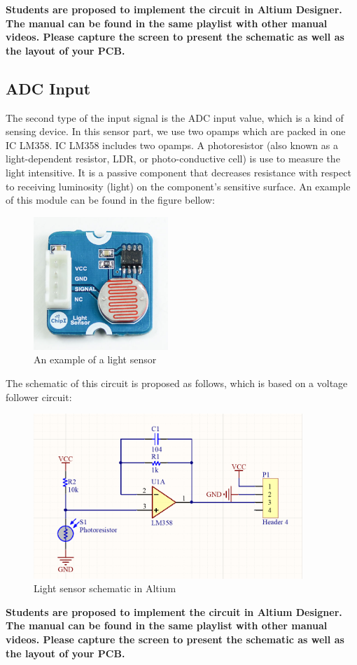 \textbf{Students are proposed to implement the circuit in Altium Designer. The manual can be found in the same playlist with other manual videos. Please capture the screen to present the schematic as well as the layout of your PCB.}

\subsection{ADC Input}
The second type of the input signal is the ADC input value, which is a kind of sensing device. In this sensor part, we use two opamps which are packed in one IC LM358. IC LM358 includes two opamps. A photoresistor (also known as a light-dependent resistor, LDR, or photo-conductive cell) is use to measure the light intensitive. It is a passive component that decreases resistance with respect to receiving luminosity (light) on the component's sensitive surface. An example of this module can be found in the figure bellow:

\begin{figure}[!htp]
    \centering
    \includegraphics[width = 2in]{source/picture/bai_6/light_sensor.PNG}
    \caption{An example of a light sensor}
    \label{altium_2a}
\end{figure}

The schematic of this circuit is proposed as follows, which is based on a voltage follower circuit:
\begin{figure}[!htp]
    \centering
    \includegraphics[width = 4in]{source/picture/bai_6/altium_2.PNG}
    \caption{Light sensor schematic in Altium}
    \label{altium_2b}
\end{figure}


\textbf{Students are proposed to implement the circuit in Altium Designer. The manual can be found in the same playlist with other manual videos. Please capture the screen to present the schematic as well as the layout of your PCB.}